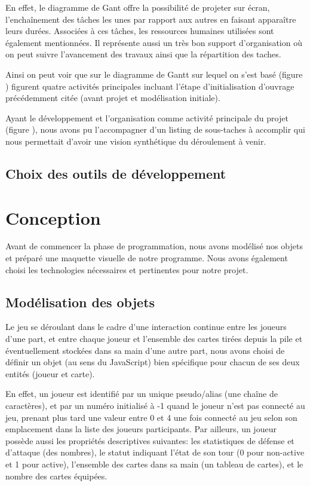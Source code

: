 \documentclass[12pt]{report}
\begin{document}
		En effet, le diagramme de Gant offre la possibilité de projeter sur écran, l’enchaînement des tâches les unes par rapport aux autres en faisant apparaître leurs durées. Associées à ces tâches, les ressources humaines utilisées sont  également mentionnées.
		Il représente aussi un très bon support d’organisation où on peut suivre l’avancement des travaux ainsi que la répartition des taches.

		Ainsi  on peut voir que sur le diagramme de Gantt sur lequel on s’est basé (figure ) figurent quatre activités principales incluant l’étape d’initialisation  d’ouvrage précédemment citée (avant projet et modélisation initiale).

		Ayant le  développement et l’organisation comme activité principale du projet (figure  ), nous avons pu l’accompagner d’un listing de sous-taches à accomplir  qui nous permettait d’avoir une vision synthétique du déroulement à venir.
\newpage


    \section{Choix des outils de développement}

\chapter{Conception}

	Avant de commencer la phase de programmation, nous avons modélisé nos objets et préparé une maquette visuelle de notre programme. Nous avons également choisi les technologies nécessaires et pertinentes pour notre projet.

    \section{Modélisation des objets}
		Le jeu se déroulant dans le cadre d'une interaction continue entre les joueurs d'une part, et entre chaque joueur et l'ensemble des cartes tirées depuis la pile et éventuellement stockées dans sa main d'une autre part, nous avons choisi de définir un objet (au sens du JavaScript) bien spécifique pour chacun de ses deux entités (joueur et carte).

		En effet, un joueur est identifié par un unique pseudo/alias (une chaîne de caractères), et par un numéro initialisé à -1 quand le joueur n'est pas connecté au jeu, prenant plus tard une valeur entre 0 et 4 une fois connecté au jeu selon son emplacement dans la liste des joueurs participants. Par ailleurs, un joueur possède aussi les propriétés descriptives suivantes: les statistiques de défense et d'attaque (des nombres), le statut indiquant l'état de son tour (0 pour non-active et 1 pour active), l'ensemble des cartes dans sa main (un tableau de cartes), et le nombre des cartes équipées.
\end{document}
